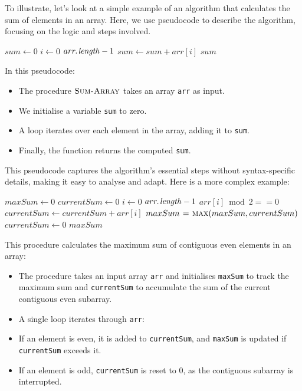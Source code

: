 To illustrate, let’s look at a simple example of an algorithm that calculates the sum of elements in an array. Here, we use pseudocode to describe the algorithm, focusing on the logic and steps involved.

\begin{codebox}
    \li $sum \gets 0$ 
    \li \For $i \gets 0$ \To $\attrib{arr}{length} - 1$ \Do
    \li     $sum \gets sum + arr[i]$ 
        \End
    \li \Return $sum$ 
\end{codebox}

In this pseudocode:
\begin{itemize}
    \item The procedure \texttt{$\proc{Sum-Array}$} takes an array \texttt{arr} as input.
    \item We initialise a variable \texttt{sum} to zero.
    \item A \texttt{\For} loop iterates over each element in the array, adding it to \texttt{sum}.
    \item Finally, the function returns the computed \texttt{sum}.
\end{itemize}

This pseudocode captures the algorithm's essential steps without syntax-specific details, making it easy to analyse and adapt. Here is a more complex example:

\begin{codebox}
    \li $maxSum \gets 0$ 
    \li $currentSum \gets 0$ 
    \li \For $i \gets 0$ \To $\attrib{arr}{length} - 1$ \Do
    \li \If $arr[i] \bmod 2 == 0$ \Then
    \li $currentSum \gets currentSum + arr[i]$ 
    \li $maxSum \gets \proc{max}(maxSum, currentSum)$ 
    \li \Else \li $currentSum \gets 0$  \End \End
    \li \Return $maxSum$ 
\end{codebox}

This procedure calculates the maximum sum of contiguous even elements in an array:

\begin{itemize}
    \item The procedure takes an input array \texttt{arr} and initialises \texttt{maxSum} to track the maximum sum and \texttt{currentSum} to accumulate the sum of the current contiguous even subarray.
    \item A single \texttt{\For} loop iterates through \texttt{arr}:
    \item If an element is even, it is added to \texttt{currentSum}, and \texttt{maxSum} is updated if \texttt{currentSum} exceeds it.
    \item If an element is odd, \texttt{currentSum} is reset to 0, as the contiguous subarray is interrupted.
\end{itemize}

